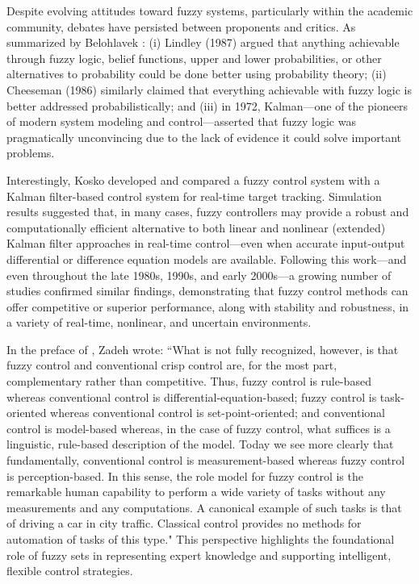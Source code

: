 \documentclass[conference]{IEEEtran}
\begin{document}
Despite evolving attitudes toward fuzzy systems, particularly within the academic community, debates have persisted between proponents and critics. As summarized by Belohlavek \cite{belohlavek2017}: (i) Lindley (1987) argued that anything achievable through fuzzy logic, belief functions, upper and lower probabilities, or other alternatives to probability could be done better using probability theory; (ii) Cheeseman (1986) similarly claimed that everything achievable with fuzzy logic is better addressed probabilistically; and (iii) in 1972, Kalman—one of the pioneers of modern system modeling and control—asserted that fuzzy logic was pragmatically unconvincing due to the lack of evidence it could solve important problems.

Interestingly, Kosko \cite{kosko1992} developed and compared a fuzzy control system with a Kalman filter-based control system for real-time target tracking. Simulation results suggested that, in many cases, fuzzy controllers may provide a robust and computationally efficient alternative to both linear and nonlinear (extended) Kalman filter approaches in real-time control—even when accurate input-output differential or difference equation models are available. Following this work—and even throughout the late 1980s, 1990s, and early 2000s—a growing number of studies confirmed similar findings, demonstrating that fuzzy control methods can offer competitive or superior performance, along with stability and robustness, in a variety of real-time, nonlinear, and uncertain environments.

In the preface of \cite{ying2000}, Zadeh wrote: ``What is not fully recognized, however, is that fuzzy control and conventional crisp control are, for the most part, complementary rather than competitive. Thus, fuzzy control is rule-based whereas conventional control is differential-equation-based; fuzzy control is task-oriented whereas conventional control is set-point-oriented; and conventional control is model-based whereas, in the case of fuzzy control, what suffices is a linguistic, rule-based description of the model. Today we see more clearly that fundamentally, conventional control is measurement-based whereas fuzzy control is perception-based. In this sense, the role model for fuzzy control is the remarkable human capability to perform a wide variety of tasks without any measurements and any computations. A canonical example of such tasks is that of driving a car in city traffic. Classical control provides no methods for automation of tasks of this type." This perspective highlights the foundational role of fuzzy sets in representing expert knowledge and supporting intelligent, flexible control strategies. 
\end{document}
